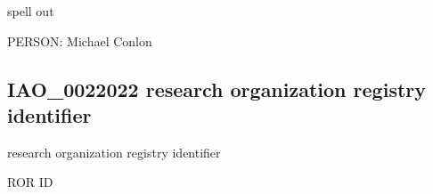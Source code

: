 \documentclass[letterpaper,10pt,english]{sphinxmanual}
\begin{document}
\begin{sphinxShadowBox}

\sphinxAtStartPar
{}
\end{sphinxShadowBox}

\begin{sphinxShadowBox}

\sphinxAtStartPar
spell out
\end{sphinxShadowBox}

\begin{sphinxShadowBox}

\sphinxAtStartPar
{}
\end{sphinxShadowBox}

\begin{sphinxShadowBox}

\sphinxAtStartPar
PERSON: Michael Conlon
\end{sphinxShadowBox}
\begin{quote}

\ignorespaces \end{quote}


\subsection{IAO\_0022022 \sphinxhyphen{} research organization registry identifier}
\label{\detokenize{doc-IAO_0022022:iao-0022022-research-organization-registry-identifier}}\label{\detokenize{doc-IAO_0022022:index-0}}\label{\detokenize{doc-IAO_0022022::doc}}
\begin{sphinxShadowBox}

\sphinxAtStartPar
research organization registry identifier
\end{sphinxShadowBox}

\begin{sphinxShadowBox}

\sphinxAtStartPar
ROR ID

\sphinxAtStartPar
{}
\end{sphinxShadowBox}
\end{document}
